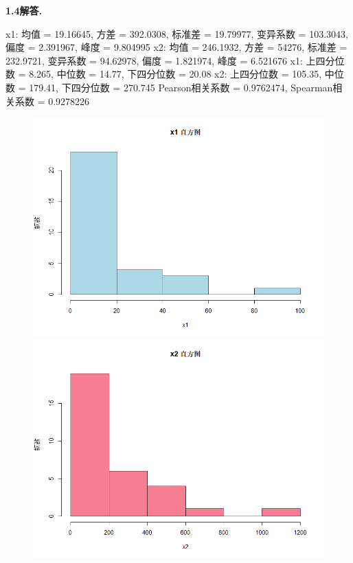 \documentclass[12pt, a4paper, oneside]{ctexart}
\newenvironment{solution}[1][]{\par\noindent\textbf{#1解答. }}{\smallskip\par}  %
\begin{document}
\begin{solution}[1.4]
    \begin{cppcode}
x1: 均值 = 19.16645, 方差 = 392.0308, 标准差 = 19.79977, 变异系数 = 103.3043, 偏度 = 2.391967, 峰度 = 9.804995
x2: 均值 = 246.1932, 方差 = 54276, 标准差 = 232.9721, 变异系数 = 94.62978, 偏度 = 1.821974, 峰度 = 6.521676
x1: 上四分位数 = 8.265, 中位数 = 14.77, 下四分位数 = 20.08
x2: 上四分位数 = 105.35, 中位数 = 179.41, 下四分位数 = 270.745
Pearson相关系数 = 0.9762474, Spearman相关系数 = 0.9278226
    \end{cppcode}
    \begin{figure}[htbp]
        \vspace{-0.5cm}
        \hspace{-2.5cm}
        \subfigure  %
        {
            \begin{minipage}[b]{.62\linewidth}
                \centering
                \includegraphics[scale=0.5]{./code/x1_histogram.png}
            \end{minipage}
        }
        \subfigure
        {
            \begin{minipage}[b]{.2\linewidth}
                \centering
                \includegraphics[scale=0.5]{./code/x2_histogram.png}

\end{minipage}}
\end{figure}
\end{solution}
\end{document}
